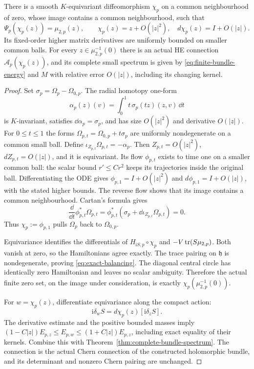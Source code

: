\begin{proposition}\label{prop:exact-balancing-coordinates}
There is a smooth $K$-equivariant diffeomorphism $\chi_p$
on a common neighbourhood of zero, whose image contains
a common neighbourhood, such that
\begin{equation}\label{eq:exact-balancing}
 \Psi_p(\chi_p(z))=\mu_{2,p}(z),\qquad
 \chi_p(z)=z+O(|z|^2),\quad d\chi_p(z)=I+O(|z|).
\end{equation}
Its fixed-order higher matrix derivatives are uniformly
bounded on smaller common balls. For every
$z\in\mu_{2,p}^{-1}(0)$ there is an actual HE connection
$\mathcal A_p(\chi_p(z))$, and its complete small spectrum
is given by \eqref{eq:finite-bundle-energy} and $M$ with
relative error $O(|z|)$, including its changing kernel.
\end{proposition}

\begin{proof}
Set $\sigma_p=\Omega_p-\Omega_{0,p}$. The radial homotopy
one-form
\[
 \alpha_p(z)(v)=\int_0^1 t\,\sigma_p(tz)(z,v)\,\dd t
\]
is $K$-invariant, satisfies $\dd\alpha_p=\sigma_p$, and
has size $O(|z|^2)$ and derivative $O(|z|)$.
For $0\le t\le1$ the forms
$\Omega_{p,t}=\Omega_{0,p}+t\sigma_p$ are uniformly
nondegenerate on a common small ball. Define
$\iota_{Z_{p,t}}\Omega_{p,t}=-\alpha_p$.
Then $Z_{p,t}=O(|z|^2)$, $dZ_{p,t}=O(|z|)$, and it
is equivariant. Its flow $\phi_{p,t}$ exists to time one
on a smaller common ball: the scalar bound
$r'\le Cr^2$ keeps its trajectories inside the original
ball. Differentiating the ODE gives
$\phi_{p,1}=I+O(|z|^2)$ and $d\phi_{p,1}=I+O(|z|)$,
with the stated higher bounds. The reverse flow shows
that its image contains a common neighbourhood.
Cartan's formula gives
\[
 \frac{\dd}{\dd t}\phi_{p,t}^*\Omega_{p,t}
   =\phi_{p,t}^*(\sigma_p+\dd\iota_{Z_{p,t}}\Omega_{p,t})=0.
\]
Thus $\chi_p:=\phi_{p,1}$ pulls $\Omega_p$ back to
$\Omega_{0,p}$.

Equivariance identifies the differentials of
$H_{\mathrm iS,p}\circ\chi_p$ and
$-V\operatorname{tr}(S\mu_{2,p})$. Both vanish at zero, so the
Hamiltonians agree exactly. The trace pairing on
$\mathfrak h$ is nondegenerate, proving
\eqref{eq:exact-balancing}. The diagonal central circle
has identically zero Hamiltonian and leaves no scalar
ambiguity. Therefore the actual finite zero set, on the
image under consideration, is exactly
$\chi_p(\mu_{2,p}^{-1}(0))$.

For $w=\chi_p(z)$, differentiate equivariance along the
compact action:
\[
       \mathrm i\delta_wS=d\chi_p(z)[\mathrm i\delta_zS].
\]
The derivative estimate and the positive bounded masses
imply $(1-C|z|)E_{p,z}\le E_{p,w}\le(1+C|z|)E_{p,z}$,
including exact equality of their kernels. Combine this
with Theorem~\ref{thm:complete-bundle-spectrum}.
The connection is the actual Chern connection of the
constructed holomorphic bundle, and its determinant and
nonzero Chern pairing are unchanged.
\end{proof}

